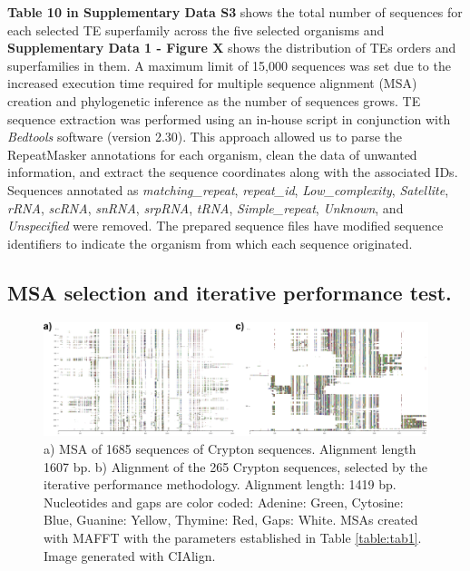 \documentclass[unnumsec,webpdf,contemporary,large]{oup-authoring-template}%
\theoremstyle{thmstyleone}%
\theoremstyle{thmstyletwo}%
\theoremstyle{thmstylethree}%
\begin{document}
\textbf{Table 10 in Supplementary Data S3} shows the total number of sequences for each selected TE superfamily across the five selected organisms and \textbf{Supplementary Data 1 - Figure X} shows the distribution of TEs orders and superfamilies in them. A maximum limit of 15,000 sequences was set due to the increased execution time required for multiple sequence alignment (MSA) creation and phylogenetic inference as the number of sequences grows. TE sequence extraction was performed using an in-house script in conjunction with \textit{Bedtools} software (version 2.30). This approach allowed us to parse the RepeatMasker annotations for each organism, clean the data of unwanted information, and extract the sequence coordinates along with the associated IDs. Sequences annotated as \textit{matching\_repeat}, \textit{repeat\_id}, \textit{Low\_complexity}, \textit{Satellite}, \textit{rRNA}, \textit{scRNA}, \textit{snRNA}, \textit{srpRNA}, \textit{tRNA}, \textit{Simple\_repeat}, \textit{Unknown}, and \textit{Unspecified} were removed. The prepared sequence files have modified sequence identifiers to indicate the organism from which each sequence originated.

\subsection{MSA selection and iterative performance test.}\label{subsec3_2}

\begin{figure}[!t]
    \centering
    \includegraphics[width=\textwidth]{figs/msas_crypton.png}
    \caption{a) MSA of 1685 sequences of Crypton sequences. Alignment length 1607 bp. b) Alignment of the 265 Crypton sequences, selected by the iterative performance methodology. Alignment length: 1419 bp. Nucleotides and gaps are color coded: Adenine: Green, Cytosine: Blue, Guanine: Yellow, Thymine: Red, Gaps: White. MSAs created with MAFFT with the parameters established in Table \ref{table:tab1}. Image generated with CIAlign.}
    \label{fig:image2}
\end{figure}
\end{document}
